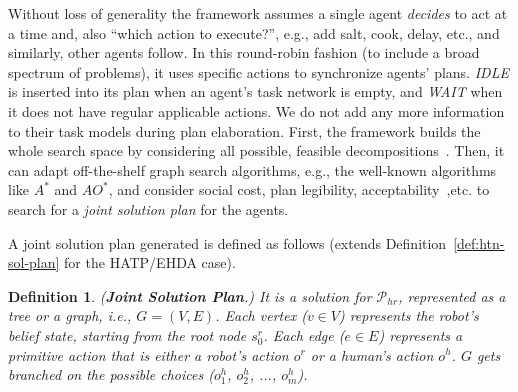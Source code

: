 \documentclass[letterpaper]{article} %
\newtheorem{definition}{Definition}
\begin{document}
Without loss of generality the framework assumes a single agent \textit{decides} to act at a time and, also ``which action to execute?'', e.g., add salt, cook, delay, etc., and similarly, other agents follow. 
In this round-robin fashion (to include a broad spectrum of problems), it uses specific actions to synchronize agents' plans. {\em IDLE} is inserted into its plan when an agent's task network is empty, and {\em WAIT} when it does not have regular applicable actions.
We do not add any more information to their task models during plan elaboration. 
First, the framework builds the whole search space by considering all possible, feasible decompositions~\cite{buisan:hal-03684211}. 
Then, it can adapt off-the-shelf graph search algorithms, e.g., the well-known algorithms like $A^*$ and $AO^*$, and consider social cost, plan legibility, acceptability~\cite{alili2009task},etc. to search for a \textit{joint solution plan} for the agents. 

A joint solution plan generated is defined as follows (extends Definition~\ref{def:htn-sol-plan} for the HATP/EHDA case).
\begin{definition}
(\textbf{Joint Solution Plan}.) 
{It is a solution for $\mathcal{P}_{hr}$, represented as a tree or a graph, i.e., $G=(V,E)$. Each vertex ($v \in V$) represents the robot's belief state, starting from the root node $s_0^r$. Each edge ($e \in E$) represents a primitive action that is either a robot's action $o^{r}$ or a human's action $o^{h}$. $G$ gets branched on the possible choices ($o^{h}_1$, $o^{h}_2$, ..., $o^{h}_m$). 
}  
\end{definition}
\end{document}
